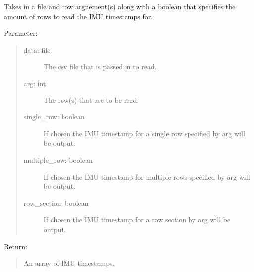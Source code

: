 \documentclass[letterpaper,10pt,english]{sphinxmanual}
\begin{document}
\label{\detokenize{Lidar extraction tool:module-imu_extract}}

\begin{fulllineitems}
\label{\detokenize{Lidar extraction tool:imu_extract.get_IMU_time}}
Takes in a file and row arguement(s) along with a boolean that specifies the amount of rows to read the IMU timestamps for.

Parameter:
\begin{quote}
\begin{description}
\item[{data: file}] \leavevmode
The csv file that is passed in to read.

\item[{arg: int}] \leavevmode
The row(s) that are to be read.

\item[{single\_row: boolean}] \leavevmode
If chosen the IMU timestamp for a single row specified by arg will be output.

\item[{multiple\_row: boolean}] \leavevmode
If chosen the IMU timestamp for multiple rows specified by arg will be output.

\item[{row\_section: boolean}] \leavevmode
If chosen the IMU timestamp for a row section by arg will be output.

\end{description}
\end{quote}

Return:
\begin{quote}

An array of IMU timestamps.
\end{quote}

\end{fulllineitems}

\end{document}
